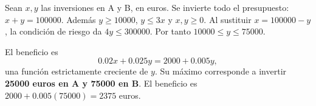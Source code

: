 Sean $x,y$ las inversiones en A y B, en euros.
Se invierte todo el presupuesto: $x+y=100000$.
Además $y\ge10000$, $y\le3x$ y $x,y\ge0$.
Al sustituir $x=100000-y$, la condición de riesgo da
$4y\le300000$. Por tanto $10000\le y\le75000$.

El beneficio es
\[
0.02x+0.025y=2000+0.005y,
\]
una función estrictamente creciente de $y$. Su máximo
corresponde a invertir \textbf{25000 euros en A y 75000 en B}.
El beneficio es $2000+0.005(75000)=\boxed{2375}$ euros.
